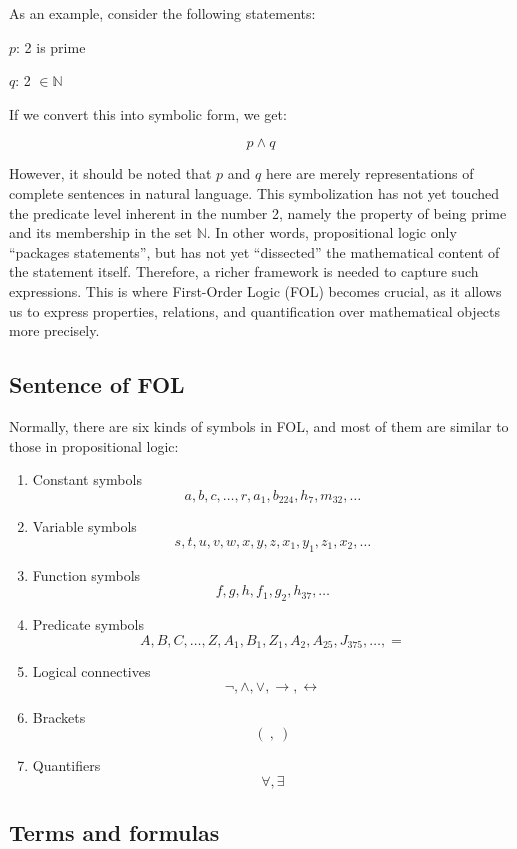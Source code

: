 \documentclass[12pt,a4paper,openany]{article}
\begin{document}
As an example, consider the following statements:

\(p\): 2 is prime

\(q\): 2 \(\in \mathbb{N}\)

If we convert this into symbolic form, we get:

\[p \land q\]

However, it should be noted that \(p\) and \(q\) here are merely
representations of complete sentences in natural language. This
symbolization has not yet touched the predicate level inherent in the
number 2, namely the property of being prime and its membership in the
set \(\mathbb{N}\). In other words, propositional logic only ``packages
statements'', but has not yet ``dissected'' the mathematical content of
the statement itself. Therefore, a richer framework is needed to capture
such expressions. This is where First-Order Logic (FOL) becomes crucial,
as it allows us to express properties, relations, and quantification
over mathematical objects more precisely.

\subsection{Sentence of FOL}\label{sentence-of-fol}

Normally, there are six kinds of symbols in FOL, and most of them are
similar to those in propositional logic:

\begin{enumerate}
\item
  Constant symbols
  \[a, b, c, \dots, r, a_1, b_{224}, h_7, m_{32}, \dots\]
\item
  Variable symbols \[s, t, u, v, w, x, y, z, x_1, y_1, z_1, x_2, \dots\]
\item
  Function symbols \[f, g, h, f_1, g_2, h_{37}, \dots\]
\item
  Predicate symbols
  \[A, B, C, \dots, Z, A_1, B_1, Z_1, A_2, A_{25}, J_{375}, \dots, =\]
\item
  Logical connectives \[\lnot, \land, \lor, \to, \leftrightarrow\]
\item
  Brackets \[( \ , \ )\]
\item
  Quantifiers \[\forall, \exists\]
\end{enumerate}

\subsection{Terms and formulas}\label{terms-and-formulas}
\end{document}
